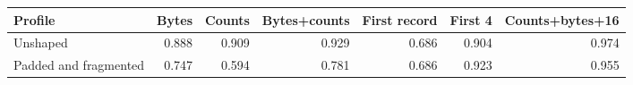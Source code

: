 \begin{tabular}{lrrrrrr}
\toprule
Profile & Bytes & Counts & Bytes+counts & First record & First 4 & Counts+bytes+16 \\
\midrule
Unshaped & 0.888 & 0.909 & 0.929 & 0.686 & 0.904 & 0.974 \\
Padded and fragmented & 0.747 & 0.594 & 0.781 & 0.686 & 0.923 & 0.955 \\
\bottomrule
\end{tabular}
